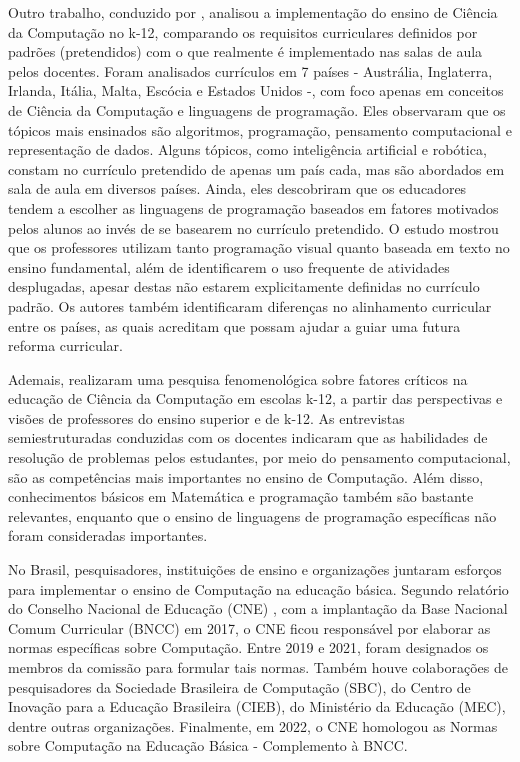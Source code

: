 Outro trabalho, conduzido por \citet{falkner2019international}, analisou a implementação do ensino de Ciência da Computação no k-12, comparando os requisitos curriculares definidos por padrões (pretendidos) com o que realmente é implementado nas salas de aula pelos docentes. Foram analisados currículos em 7 países - Austrália, Inglaterra, Irlanda, Itália, Malta, Escócia e Estados Unidos -, com foco apenas em conceitos de Ciência da Computação e linguagens de programação. Eles observaram que os tópicos mais ensinados são algoritmos, programação, pensamento computacional e representação de dados. Alguns tópicos, como inteligência artificial e robótica, constam no currículo pretendido de apenas um país cada, mas são abordados em sala de aula em diversos países. Ainda, eles descobriram que os educadores tendem a escolher as linguagens de programação baseados em fatores motivados pelos alunos ao invés de se basearem no currículo pretendido. O estudo mostrou que os professores utilizam tanto programação visual quanto baseada em texto no ensino fundamental, além de identificarem o uso frequente de atividades desplugadas, apesar destas não estarem explicitamente definidas no currículo padrão. Os autores também identificaram diferenças no alinhamento curricular entre os países, as quais acreditam que possam ajudar a guiar uma futura reforma curricular.

Ademais, \citet{zhu2023core} realizaram uma pesquisa fenomenológica sobre fatores críticos na educação de Ciência da Computação em escolas k-12, a partir das perspectivas e visões de professores do ensino superior e de k-12. As entrevistas semiestruturadas conduzidas com os docentes indicaram que as habilidades de resolução de problemas pelos estudantes, por meio do pensamento computacional, são as competências mais importantes no ensino de Computação. Além disso, conhecimentos básicos em Matemática e programação também são bastante relevantes, enquanto que o ensino de linguagens de programação específicas não foram consideradas importantes.

No Brasil, pesquisadores, instituições de ensino e organizações juntaram esforços para implementar o ensino de Computação na educação básica. Segundo relatório do Conselho Nacional de Educação (CNE) \citep{brasil2021normas}, com a implantação da Base Nacional Comum Curricular (BNCC) em 2017, o CNE ficou responsável por elaborar as normas específicas sobre Computação. Entre 2019 e 2021, foram designados os membros da comissão para formular tais normas. Também houve colaborações de pesquisadores da Sociedade Brasileira de Computação (SBC), do Centro de Inovação para a Educação Brasileira (CIEB), do Ministério da Educação (MEC), dentre outras organizações. Finalmente, em 2022, o CNE homologou as Normas sobre Computação na Educação Básica - Complemento à BNCC. 

